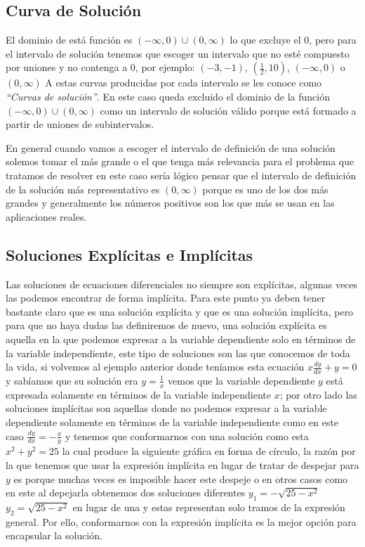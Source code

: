 \documentclass[12pt, letterpaper]{article}
\begin{document}
        \subsection{Curva de Solución}
            \noindent
                El dominio de está función es $(-\infty, 0) \cup (0, \infty)$ lo que excluye el 0, pero para el intervalo de solución tenemos que escoger un intervalo que no esté compuesto por uniones y no contenga a 0, por ejemplo: $(-3, -1)$, $(\frac{1}{2},10)$, $(-\infty, 0)$ o $(0, \infty)$ A estas curvas producidas por cada intervalo se les conoce como \emph{``Curvas de solución''}. En este caso queda excluido el dominio de la función $(-\infty, 0) \cup (0, \infty)$ como un intervalo de solución válido porque está formado a partir de uniones de subintervalos.
            \par
                En general cuando vamos a escoger el intervalo de definición de una solución solemos tomar el más grande o el que tenga más relevancia para el problema que tratamos de resolver en este caso sería lógico pensar que el intervalo de definición de la solución más representativo es $(0, \infty)$ porque es uno de los dos más grandes y generalmente los números positivos son los que más se usan en las aplicaciones reales.
        \subsection{Soluciones Explícitas e Implícitas}
            \noindent
                Las soluciones de ecuaciones diferenciales no siempre son explícitas, algunas veces las podemos encontrar de forma implícita. Para este punto ya deben tener bastante claro que es una solución explícita y que es una solución implícita, pero para que no haya dudas las definiremos de nuevo, una solución explícita es aquella en la que podemos expresar a la variable dependiente solo en términos de la variable independiente, este tipo de soluciones son las que conocemos de toda la vida, si volvemos al ejemplo anterior donde teníamos esta ecuación $x\frac{dy}{dx}+y=0$ y sabíamos que su solución era $y = \frac{1}{x}$ vemos que la variable dependiente $y$ está expresada solamente en términos de la variable independiente $x$; por otro lado las soluciones implícitas son aquellas donde no podemos expresar a la variable dependiente solamente en términos de la variable independiente como en este caso $\frac{dy}{dx}=-\frac{x}{y}$ y tenemos que conformarnos con una solución como esta $x^2+y^2=25$ la cual produce la siguiente gráfica en forma de círculo, la razón por la que tenemos que usar la expresión implícita en lugar de tratar de despejar para $y$ es porque muchas veces es imposible hacer este despeje o en otros casos como en este al depejarla obtenemos dos soluciones diferentes $y_1=-\sqrt{25-x^2}$ $y_2=\sqrt{25-x^2}$ en lugar de una y estas representan solo tramos de la expresión general. Por ello, conformarnos con la expresión implícita es la mejor opción para encapsular la solución.
\end{document}
